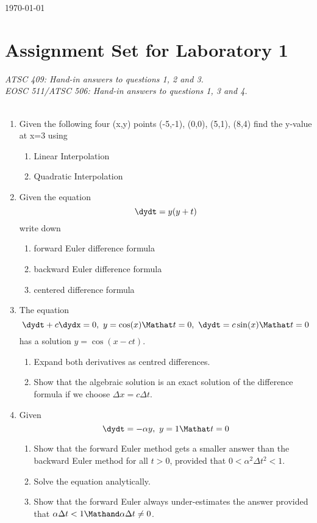 \documentclass[12pt]{article}
\begin{document}
\begin{flushright}
\today
\end{flushright}

\section*{Assignment Set for Laboratory 1}
{\it ATSC 409: Hand-in answers to questions 1, 2 and 3.\\
EOSC 511/ATSC 506: Hand-in answers to questions 1, 3 and 4.}\\[12pt]

\\[12pt]

\begin{enumerate}
\item Given the following four (x,y) points  (-5,-1), (0,0), (5,1), (8,4) find the y-value at x=3 using
\begin{enumerate}
\item Linear Interpolation
\item Quadratic Interpolation
\end{enumerate}
\item Given the equation
\begin{equation}
\dydt = y(y+t)
\end{equation}
write down
\begin{enumerate}
\item forward Euler difference formula
\item backward Euler difference formula
\item centered difference formula
\end{enumerate}
\item The equation
\begin{equation}
\dydt + c \dydx = 0,\ y = \cos(x) \Mathat t=0,\ \dydt = c \sin(x) \Mathat t=0
\end{equation}
has a solution $y=\cos(x-ct)$.
\begin{enumerate}
\item Expand both derivatives as centred differences.
\item Show that the algebraic solution is an exact solution of the difference formula if we choose $\Delta x = c \Delta t$.
\end{enumerate}
\item Given
\begin{equation}
\dydt = -\alpha y,\ y = 1 \Mathat t=0
\end{equation}
\begin{enumerate}
\item Show that the forward Euler method gets a smaller answer than the backward Euler method for all $t > 0$, provided that $0 < \alpha^2 \Delta t^2 < 1$.
\item Solve the equation analytically.
\item Show that the forward Euler always under-estimates the answer provided that $\alpha \Delta t < 1 \Mathand \alpha \Delta t \ne 0$.
\end{enumerate}\end{enumerate}
\end{document}

